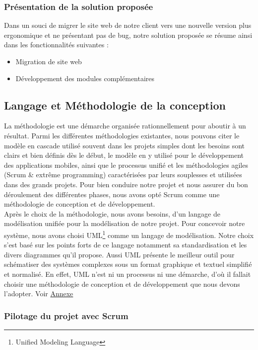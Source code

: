 \documentclass{article}
\begin{document}
\subsubsection{Présentation de la solution proposée}
Dans un souci de migrer le site web de notre client vers une nouvelle version plus ergonomique et ne présentant pas de bug,  notre solution proposée se résume ainsi dans les fonctionnalités suivantes :
\begin{itemize}
\item Migration de site web
\item Développement des modules complémentaires
\end{itemize}

\subsection{Langage et Méthodologie de la conception}
La méthodologie est une démarche organisée rationnellement pour aboutir à un résultat.
Parmi les différentes méthodologies existantes, nous pouvons citer le modèle en cascade utilisé souvent dans les projets simples dont les besoins sont clairs et bien définis dès le début, le modèle en y utilisé pour le développement des applications mobiles, ainsi que le processus unifié et les méthodologies agiles (Scrum \& extrême programming) caractérisées par leurs souplesses et utilisées dans des grands projets.
Pour bien conduire notre projet et nous assurer du bon déroulement des différentes phases, nous avons opté Scrum comme une méthodologie de conception et de développement.\\
Après le choix de la méthodologie, nous avons besoins, d’un langage de modélisation unifiée pour la modélisation de notre projet. Pour concevoir notre système, nous avons choisi UML\footnote{Unified Modeling Language}  comme un langage de modélisation.
Notre choix s'est basé sur les points forts de ce langage notamment sa standardisation et les divers diagrammes qu’il propose. Aussi UML présente le meilleur outil pour schématiser des systèmes complexes sous un format graphique et textuel simplifié et normalisé.
En effet, UML n'est ni un processus ni une démarche, d'où il fallait choisir une méthodologie de conception et de développement que nous devons l'adopter. Voir \hyperref[sec:hello]{Annexe}

\subsubsection{Pilotage du projet avec Scrum}
\end{document}
